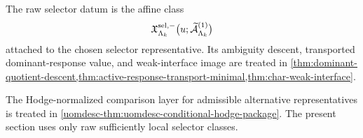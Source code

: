 \documentclass[11pt]{article}
\begin{document}
\begin{remark}
\label{rem:selector-handoff}
The raw selector datum is the affine class
\[
\mathfrak X_{\Lambda_k}^{{\rm sel},-}
\big(u;\widetilde{\mathcal A}^{(1)}_{\Lambda_k}\big)
\]
attached to the chosen selector representative.
Its ambiguity descent, transported dominant-response value, and weak-interface image are treated in
\cref{thm:dominant-quotient-descent,thm:active-response-transport-minimal,thm:char-weak-interface}.
\end{remark}

\begin{remark}
\label{rem:selector-vs-hodge}
The Hodge-normalized comparison layer for admissible alternative representatives is treated in
\cref{uomdesc-thm:uomdesc-conditional-hodge-package}.
The present section uses only raw sufficiently local selector classes.
\end{remark}

\ifdefined\UOMTransportFragmentLoaded\else
\end{document}
